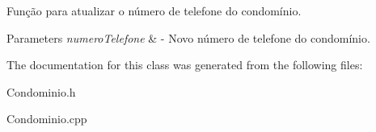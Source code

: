 Função para atualizar o número de telefone do condomínio. 


\begin{DoxyParams}{Parameters}
{\em numero\+Telefone} & -\/ Novo número de telefone do condomínio. \\
\hline
\end{DoxyParams}


The documentation for this class was generated from the following files\+:\begin{DoxyCompactItemize}
\item 
Condominio.\+h\item 
Condominio.\+cpp\end{DoxyCompactItemize}
